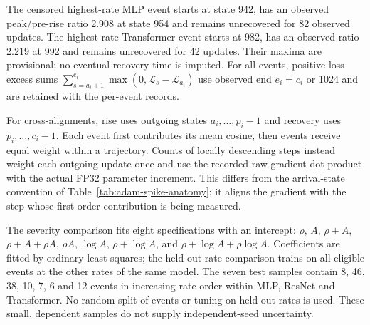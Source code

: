 \begin{table}[tp]
 \centering
 \caption{Adam event incidence and threshold sensitivity per 1,024-update
 trajectory. $N_q$ counts recovered events strictly above $q$\%; $C_{10}$
 counts censored candidates above 10\%. Occupancy is the fraction of
 outgoing updates in the union of intervals $[a_i,c_i)$ (or $[a_i,1024)$
 if censored), for events above 10\%. The cosine column reports negative
 over defined pre-rise measurements in the recovered sample. Mean
 $\Delta\mathcal L$ is the absolute peak minus pre-rise loss of recovered
 events above 10\%, in each model's objective units.}
 \label{tab:adam-incidence}
 \small
 \setlength{\tabcolsep}{4pt}
 
\end{table}

The censored highest-rate MLP event starts at state 942, has an observed
peak/pre-rise ratio 2.908 at state 954 and remains unrecovered for 82
observed updates. The highest-rate Transformer event starts at 982,
has an observed ratio 2.219 at 992 and remains unrecovered for 42 updates.
Their maxima are provisional; no eventual recovery time is imputed.
For all events, positive loss excess sums
$\sum_{s=a_i+1}^{e_i}\max(0,\mathcal L_s-\mathcal L_{a_i})$ use observed
end $e_i=c_i$ or 1024 and are retained with the per-event records.

For cross-alignments, rise uses outgoing states $a_i,\ldots,p_i-1$ and
recovery uses $p_i,\ldots,c_i-1$. Each event first contributes its mean
cosine, then events receive equal weight within a trajectory. Counts of
locally descending steps instead weight each outgoing update once and
use the recorded raw-gradient dot product with the actual FP32 parameter
increment. This differs from the arrival-state convention of
Table~\ref{tab:adam-spike-anatomy}; it aligns the gradient with the step
whose first-order contribution is being measured.

The severity comparison fits eight specifications with an intercept:
$\rho$, $A$, $\rho+A$, $\rho+A+\rho A$, $\rho A$, $\log A$,
$\rho+\log A$, and $\rho+\log A+\rho\log A$.
Coefficients are fitted by ordinary least squares; the held-out-rate
comparison trains on all eligible events at the other rates of the same
model. The seven test samples contain 8, 46, 38, 10, 7, 6 and 12 events
in increasing-rate order within MLP, ResNet and Transformer.
No random split of events or tuning on held-out rates is used.
These small, dependent samples do not supply independent-seed uncertainty.
